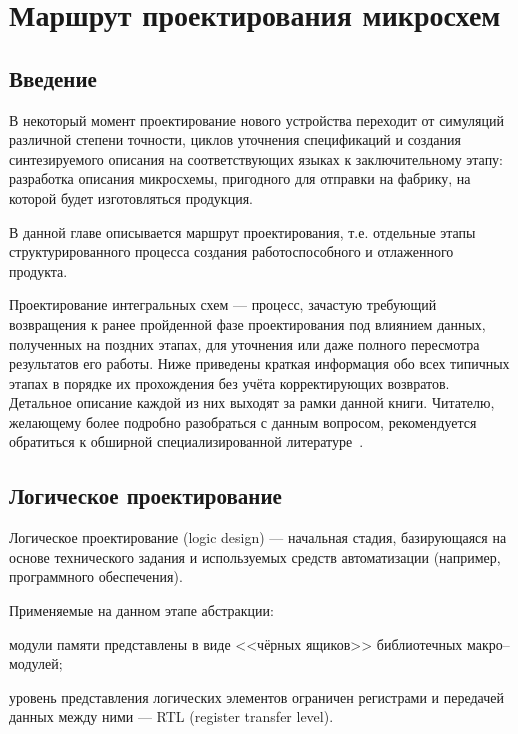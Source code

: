 \chapter{Маршрут проектирования микросхем}\label{appendix:ic-route}


\section{Введение}
    
В некоторый момент проектирование нового устройства переходит от симуляций различной степени точности, циклов уточнения спецификаций и создания синтезируемого описания на соответствующих языках к заключительному этапу: разработка описания микросхемы, пригодного для отправки на фабрику, на которой будет изготовляться продукция.

В данной главе описывается маршрут проектирования, т.е. отдельные этапы структурированного процесса создания работоспособного и отлаженного продукта.

Проектирование интегральных схем — процесс, зачастую требующий возвращения к ранее пройденной фазе проектирования под влиянием данных, полученных на поздних этапах, для уточнения или даже полного пересмотра результатов его работы. Ниже приведены краткая информация обо всех типичных этапах в порядке их прохождения без учёта корректирующих возвратов. Детальное описание каждой из них выходят за рамки данной книги. Читателю, желающему более подробно разобраться с данным вопросом, рекомендуется обратиться к обширной специализированной литературе~\cite{books/daglib/0027783, dicd}.

\section{Логическое проектирование}

Логическое проектирование (\abbr logic design) — начальная стадия, базирующаяся на основе технического задания и используемых средств автоматизации (например, программного обеспечения).

Применяемые на данном этапе абстракции:
\begin{itemize*}
    \item модули памяти представлены в виде <<чёрных ящиков>> библиотечных макро--модулей;
    \item уровень представления логических элементов ограничен регистрами и передачей данных между ними — RTL (\abbr register transfer level).
\end{itemize*}

